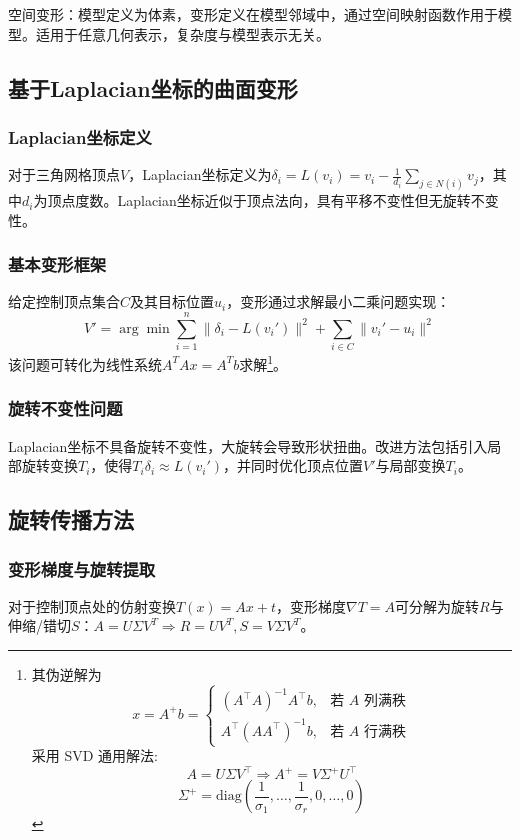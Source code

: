\documentclass[12pt]{article}
\begin{document}
空间变形：模型定义为体素，变形定义在模型邻域中，通过空间映射函数作用于模型。适用于任意几何表示，复杂度与模型表示无关。

\subsection{基于Laplacian坐标的曲面变形}

\subsubsection{Laplacian坐标定义}
对于三角网格顶点$V$，Laplacian坐标定义为$\delta_i = L(v_i) = v_i - \frac{1}{d_i} \sum_{j \in N(i)} v_j$，其中$d_i$为顶点度数。Laplacian坐标近似于顶点法向，具有平移不变性但无旋转不变性。

\subsubsection{基本变形框架}
给定控制顶点集合$C$及其目标位置$u_i$，变形通过求解最小二乘问题实现：
\[
V' = \arg\min \sum_{i=1}^n \| \delta_i - L(v_i') \|^2 + \sum_{i \in C} \| v_i' - u_i \|^2
\]
该问题可转化为线性系统$A^T A x = A^T b$求解\footnote{
    其伪逆解为\[
x = A^+b = 
\begin{cases}
(A^{\top}A)^{-1}A^{\top}b, & \text{若 } A \text{ 列满秩} \\
A^{\top}(AA^{\top})^{-1}b, & \text{若 } A \text{ 行满秩}
\end{cases}
\]
采用 SVD 通用解法:
\[
A = U\Sigma V^{\top} \Rightarrow A^+ = V\Sigma^+ U^{\top}
\]
\[
\Sigma^+ = \text{diag}\left(\frac{1}{\sigma_1}, \dots, \frac{1}{\sigma_r}, 0, \dots, 0\right)
\]
}。

\subsubsection{旋转不变性问题}
Laplacian坐标不具备旋转不变性，大旋转会导致形状扭曲。改进方法包括引入局部旋转变换$T_i$，使得$T_i \delta_i \approx L(v_i')$，并同时优化顶点位置$V'$与局部变换$T_i$。

\subsection{旋转传播方法}

\subsubsection{变形梯度与旋转提取}
对于控制顶点处的仿射变换$T(x) = Ax + t$，变形梯度$\nabla T = A$可分解为旋转$R$与伸缩/错切$S$：$A = U \Sigma V^T \Rightarrow R = UV^T, S = V \Sigma V^T$。
\end{document}
